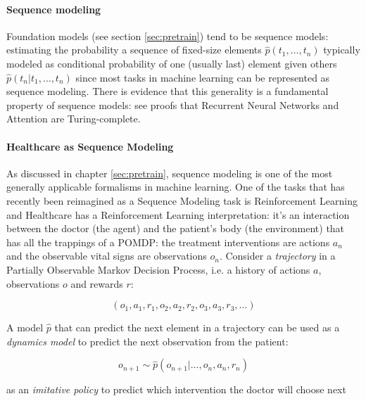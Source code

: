 \paragraph{Sequence modeling}

Foundation models (see section \ref{sec:pretrain}) tend to be sequence models: estimating the probability a sequence of fixed-size elements $\hat{p}(t_1, \dots, t_n)$ typically modeled as conditional probability of one (usually last) element given others $\hat{p}(t_n | t_1, \dots, t_n)$ since most tasks in machine learning can be represented as sequence modeling. 
There is evidence that this generality is a fundamental property of sequence models: see proofs that Recurrent Neural Networks \cite{siegelmannComputationTuringLimit1995} and Attention \cite{perezAttentionTuringComplete} are Turing-complete.

\paragraph{Healthcare as Sequence Modeling}
\label{sec:sequencemodel}

As discussed in chapter \ref{sec:pretrain}, sequence modeling is one of the most generally applicable formalisms in machine learning.
One of the tasks that has recently been reimagined as a Sequence Modeling task is Reinforcement Learning and Healthcare has a Reinforcement Learning interpretation: it's an interaction between the doctor (the agent) and the patient's body (the environment) that has all the trappings of a POMDP: the treatment interventions are actions $a_n$ and the observable vital signs are observations $o_n$.
Consider a \emph{trajectory} in a Partially Observable Markov Decision Process, i.e. a history of actions $a$, observations $o$ and rewards $r$:

\begin{equation}
    (o_1, a_1, r_1, o_2, a_2, r_2, o_3, a_3, r_3, \dots)
\end{equation}

A model $\hat{p}$ that can predict the next element in a trajectory can be used as a \emph{dynamics model} to predict the next observation from the patient:

\begin{equation}
    o_{n+1} \sim \hat{p}(o_{n+1} | \dots, o_n, a_n, r_n)
\end{equation}

as an \emph{imitative policy} to predict which intervention the doctor will choose next

